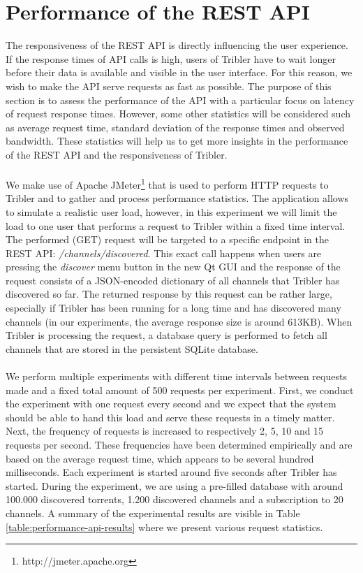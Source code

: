 \section{Performance of the REST API}
The responsiveness of the REST API is directly influencing the user experience. If the response times of API calls is high, users of Tribler have to wait longer before their data is available and visible in the user interface. For this reason, we wish to make the API serve requests as fast as possible. The purpose of this section is to assess the performance of the API with a particular focus on latency of request response times. However, some other statistics will be considered such as average request time, standard deviation of the response times and observed bandwidth. These statistics will help us to get more insights in the performance of the REST API and the responsiveness of Tribler.\\\\
We make use of Apache JMeter\footnote{http://jmeter.apache.org} that is used to perform HTTP requests to Tribler and to gather and process performance statistics. The application allows to simulate a realistic user load, however, in this experiment we will limit the load to one user that performs a request to Tribler within a fixed time interval. The performed (GET) request will be targeted to a specific endpoint in the REST API: \emph{/channels/discovered}. This exact call happens when users are pressing the \emph{discover} menu button in the new Qt GUI and the response of the request consists of a JSON-encoded dictionary of all channels that Tribler has discovered so far. The returned response by this request can be rather large, especially if Tribler has been running for a long time and has discovered many channels (in our experiments, the average response size is around 613KB). When Tribler is processing the request, a database query is performed to fetch all channels that are stored in the persistent SQLite database.\\\\
We perform multiple experiments with different time intervals between requests made and a fixed total amount of 500 requests per experiment. First, we conduct the experiment with one request every second and we expect that the system should be able to hand this load and serve these requests in a timely matter. Next, the frequency of requests is increased to respectively 2, 5, 10 and 15 requests per second. These frequencies have been determined empirically and are based on the average request time, which appears to be several hundred milliseconds. Each experiment is started around five seconds after Tribler has started. During the experiment, we are using a pre-filled database with around 100.000 discovered torrents, 1.200 discovered channels and a subscription to 20 channels. A summary of the experimental results are visible in Table \ref{table:performance-api-results} where we present various request statistics.\\

